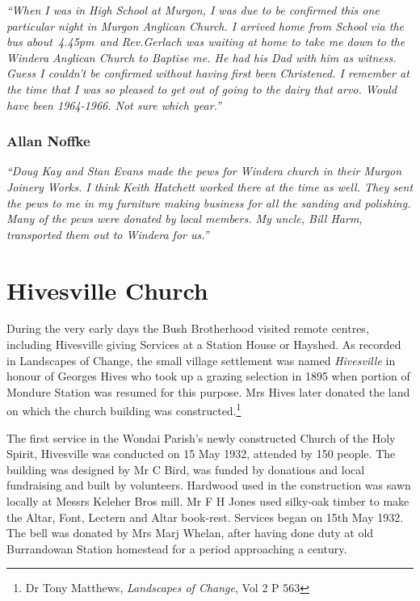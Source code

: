 \emph{``When I was in High School at Murgon, I was due to be confirmed this one particular night in Murgon Anglican Church. I arrived home from School via the bus about~4.45pm~and Rev.Gerlach was waiting at home to take me down to the Windera Anglican Church to Baptise me. He had his Dad with him as witness. Guess I couldn't be confirmed without having first been Christened. I remember at the time that I was so pleased to get out of going to the dairy that arvo. Would have been 1964-1966. Not sure which year.''}

\hypertarget{allan-noffke}{%
\subsubsection{Allan Noffke}\label{allan-noffke}}

\emph{``Doug Kay and Stan Evans made the pews for Windera church in their Murgon Joinery Works. I think Keith Hatchett worked there at the time as well. They sent the pews to me in my furniture making business for all the sanding and polishing. Many of the pews were donated by local members. My uncle, Bill Harm, transported them out to Windera for us.''}

\hypertarget{hivesville-church}{%
\section{Hivesville Church}\label{hivesville-church}}

During the very early days the Bush Brotherhood visited remote centres, including Hivesville giving Services at a Station House or Hayshed. As recorded in Landscapes of Change, the small village settlement was named \emph{Hivesville} in honour of Georges Hives who took up a grazing selection in 1895 when portion of Mondure Station was resumed for this purpose. Mrs Hives later donated the land on which the church building was constructed.\footnote{Dr Tony Matthews, \emph{Landscapes of Change}, Vol 2 P 563}

The first service in the Wondai Parish's newly constructed Church of the Holy Spirit, Hivesville was conducted on 15 May 1932, attended by 150 people. The building was designed by Mr C Bird, was funded by donations and local fundraising and built by volunteers. Hardwood used in the construction was sawn locally at Messrs Keleher Bros mill. Mr F H Jones used silky-oak timber to make the Altar, Font, Lectern and Altar book-rest. Services began on 15th May 1932. The bell was donated by Mrs Marj Whelan, after having done duty at old Burrandowan Station homestead for a period approaching a century.

